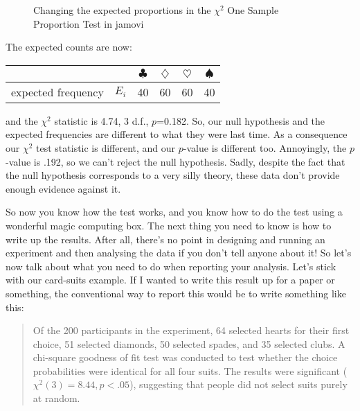 \begin{figure}
\begin{center}
\caption{Changing the expected proportions in the $\chi^2$ One Sample Proportion Test in jamovi}
\label{fig:chisquare.analysis2}
\HR
\end{center}
\end{figure}

The expected counts are now: 

\begin{center}
\begin{tabular}{rc|cccc}
& & $\clubsuit$ & $\diamondsuit$ & $\heartsuit$ & $\spadesuit$ \\ \hline 
expected frequency &$E_i$ & 40 & 60 & 60 & 40 \\ 
\end{tabular}
\end{center}

and the $\chi^2$ statistic is 4.74, 3 d.f., $p$=0.182. So, our null hypothesis and the expected frequencies are different to what they were last time. As a consequence our $\chi^2$ test statistic is different, and our $p$-value is different too. Annoyingly, the $p$-value is .192, so we can't reject the null hypothesis. Sadly, despite the fact that the null hypothesis corresponds to a very silly theory, these data don't provide enough evidence against it.



So now you know how the test works, and you know how to do the test using a wonderful magic computing box. The next thing you need to know is how to write up the results. After all, there's no point in designing and running an experiment and then analysing the data if you don't tell anyone about it! So let's now talk about what you need to do when reporting your analysis. Let's stick with our card-suits example. If I wanted to write this result up for a paper or something, the conventional way to report this would be to write something like this:

\begin{quote}
Of the 200 participants in the experiment, 64 selected hearts for their first choice, 51 selected diamonds, 50 selected spades, and 35 selected clubs. A chi-square goodness of fit test was conducted to test whether the choice probabilities were identical for all four suits. The results were significant ($\chi^2(3) = 8.44, p<.05$), suggesting that people did not select suits purely at random.
\end{quote}

